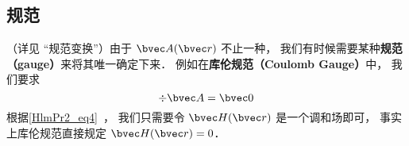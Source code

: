 \subsection{规范}
（详见 “规范变换”）由于 $\bvec A(\bvec r)$ 不止一种， 我们有时候需要某种\textbf{规范（gauge）}来将其唯一确定下来． 例如在\textbf{库伦规范（Coulomb Gauge）}中， 我们要求
\begin{equation}
\div \bvec A = \bvec 0
\end{equation}
根据\autoref{HlmPr2_eq4}~， 我们只需要令 $\bvec H(\bvec r)$ 是一个调和场即可， 事实上库伦规范直接规定 $\bvec H(\bvec r) = 0$．
